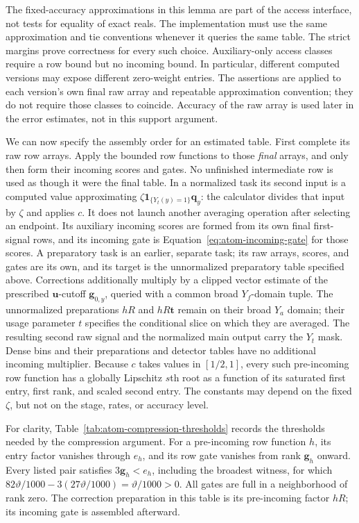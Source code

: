\documentclass[11pt]{article}
\numberwithin{equation}{section}
\theoremstyle{definition}
\theoremstyle{remark}
\begin{document}
The fixed-accuracy approximations in this lemma are part of the access
interface, not tests for equality of exact reals.  The implementation
must use the same approximation and tie conventions whenever it queries
the same table.  The strict margins prove correctness for every such
choice.  Auxiliary-only access classes require a row bound but no
incoming bound.
In particular, different computed versions may expose different
zero-weight entries.  The assertions are applied to each version's own
final raw array and repeatable approximation convention; they do not
require those classes to coincide.  Accuracy of the raw array is used
later in the error estimates, not in this support argument.


We can now specify the assembly order for an estimated table. First complete its raw row arrays. Apply the bounded row functions to those \emph{final} arrays, and only then form their incoming scores and gates. No unfinished intermediate row is used as though it were the final table.  In a normalized task its second input is a
computed value approximating $\zeta\mathbf1_{\{Y_t(y)=1\}}{\mathbf{q}}_y$: the
calculator divides that input by $\zeta$ and applies $c$.  It does not launch another averaging
operation after selecting an endpoint.  Its auxiliary incoming scores
are formed from its own final first-signal rows, and its incoming gate
is Equation~\eqref{eq:atom-incoming-gate} for those scores.  A preparatory
task is an earlier, separate task; its raw arrays, scores, and gates are
its own, and its target is the unnormalized preparatory table specified
above.  Corrections additionally multiply by a clipped vector estimate
of the prescribed ${\mathbf{u}}$-cutoff ${\mathbf{g}}_{0,y}$, queried with a common broad
$Y_f$-domain tuple.  The unnormalized preparations $hR$ and $hR{\mathbf{t}}$
remain on their broad $Y_a$ domain; their usage parameter $t$ specifies
the conditional slice on which they are averaged.  The resulting
second raw signal and the normalized main output carry the $Y_t$ mask.
Dense bins and their preparations and detector tables have
no additional incoming multiplier.
Because $c$ takes values in $[1/2,1]$, every such pre-incoming row
function has a globally Lipschitz $s$th root as a function of its
saturated first entry, first rank, and scaled second entry.  The constants
may depend on the fixed $\zeta$, but not on the stage, rates, or accuracy level.

For clarity, Table~\ref{tab:atom-compression-thresholds} records the
thresholds needed by the compression argument.  For a pre-incoming row
function ${h}$, its entry factor vanishes through $e_{h}$, and its row gate
vanishes from rank ${\mathbf{g}}_{h}$ onward.  Every listed pair satisfies
$3{\mathbf{g}}_{h}<e_{h}$, including the broadest witness, for which
$82\vartheta/1000-3(27\vartheta/1000)=\vartheta/1000>0$.
All gates are full in a neighborhood of rank zero.  The correction
preparation in this table is its pre-incoming factor $hR$; its incoming
gate is assembled afterward.
\end{document}

